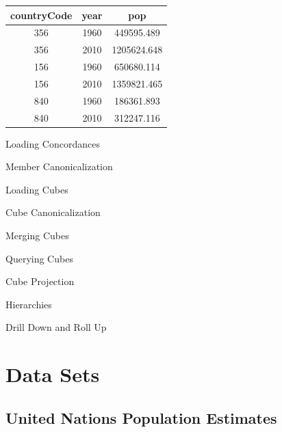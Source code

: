 \begin{center}
  \begin{tabular}{ | c | c | c | }
    \hline
    \textbf{countryCode} & \textbf{year}& \textbf{pop} \\ \hline
    356 & 1960 & 449595.489 \\ \hline
    356 & 2010 & 1205624.648 \\ \hline
    156 & 1960 & 650680.114 \\ \hline
    156 & 2010 & 1359821.465 \\ \hline
    840 & 1960 & 186361.893 \\ \hline
    840 & 2010 & 312247.116 \\ \hline
  \end{tabular}
\end{center}



Loading Concordances

Member Canonicalization 

Loading Cubes

Cube Canonicalization 

Merging Cubes

Querying Cubes

Cube Projection

Hierarchies

Drill Down and Roll Up

\section{Data Sets}
\subsection{United Nations Population Estimates}
